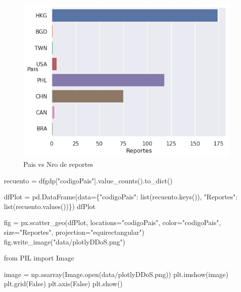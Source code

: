 \documentclass[
  letterpaper,
  DIV=11,
  numbers=noendperiod]{scrartcl}
\newenvironment{Shaded}{\begin{snugshade}}{\end{snugshade}}
\newcommand{\BuiltInTok}[1]{\textcolor[rgb]{0.00,0.23,0.31}{#1}}
\newcommand{\ImportTok}[1]{\textcolor[rgb]{0.00,0.46,0.62}{#1}}
\newcommand{\NormalTok}[1]{\textcolor[rgb]{0.00,0.23,0.31}{#1}}
\newcommand{\OperatorTok}[1]{\textcolor[rgb]{0.37,0.37,0.37}{#1}}
\newcommand{\StringTok}[1]{\textcolor[rgb]{0.13,0.47,0.30}{#1}}
\newcommand{\VariableTok}[1]{\textcolor[rgb]{0.07,0.07,0.07}{#1}}
\begin{document}
\begin{figure}[H]

{\centering \includegraphics{Análisis_files/figure-pdf/fig-countplotddos-output-1.png}

}

\caption{\label{fig-countplotddos}Pais vs Nro de reportes}

\end{figure}

\begin{Shaded}
\begin{Highlighting}[]
\NormalTok{recuento }\OperatorTok{=}\NormalTok{ dfgdp[}\StringTok{"codigoPais"}\NormalTok{].value\_counts().to\_dict()}

\NormalTok{dfPlot }\OperatorTok{=}\NormalTok{ pd.DataFrame(data}\OperatorTok{=}\NormalTok{\{}\StringTok{"codigoPais"}\NormalTok{: }\BuiltInTok{list}\NormalTok{(recuento.keys()), }\StringTok{"Reportes"}\NormalTok{: }\BuiltInTok{list}\NormalTok{(recuento.values())\})}
\NormalTok{dfPlot}

\NormalTok{fig }\OperatorTok{=}\NormalTok{ px.scatter\_geo(dfPlot, locations}\OperatorTok{=}\StringTok{"codigoPais"}\NormalTok{, color}\OperatorTok{=}\StringTok{"codigoPais"}\NormalTok{, size}\OperatorTok{=}\StringTok{"Reportes"}\NormalTok{,}
\NormalTok{                     projection}\OperatorTok{=}\StringTok{"equirectangular"}\NormalTok{)}
\NormalTok{fig.write\_image(}\StringTok{"data/plotlyDDoS.png"}\NormalTok{)}
\end{Highlighting}
\end{Shaded}

\begin{Shaded}
\begin{Highlighting}[]
\ImportTok{from}\NormalTok{ PIL }\ImportTok{import}\NormalTok{ Image }

\NormalTok{image }\OperatorTok{=}\NormalTok{ np.asarray(Image.}\BuiltInTok{open}\NormalTok{(}\StringTok{\textquotesingle{}data/plotlyDDoS.png\textquotesingle{}}\NormalTok{))}
\NormalTok{plt.imshow(image)}
\NormalTok{plt.grid(}\VariableTok{False}\NormalTok{)}
\NormalTok{plt.axis(}\VariableTok{False}\NormalTok{)}
\NormalTok{plt.show()}
\end{Highlighting}
\end{Shaded}
\end{document}
